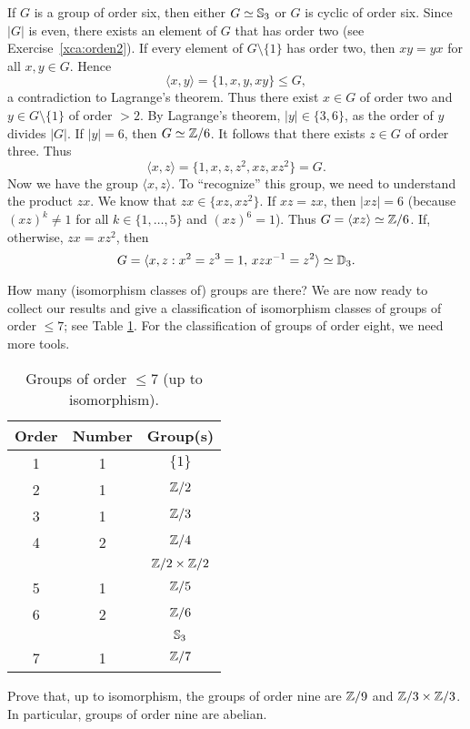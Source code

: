 \begin{example}
If $G$ is a group of order six, then
either $G\simeq\mathbb{S}_3$ or $G$ is cyclic of order six. 
Since $|G|$ is even, there exists an element of $G$ 
that has order two (see Exercise~\ref{xca:orden2}). 
If every element of $G\setminus\{1\}$ has order two, then
$xy=yx$ for all $x,y\in G$. Hence 
\[
\langle x,y\rangle=\{1,x,y,xy\}\leq G,
\]
a contradiction to Lagrange's theorem. Thus there exist 
$x\in G$ of order two 
and $y\in G\setminus\{1\}$ of order $>2$. 
By Lagrange's theorem, $|y|\in\{3,6\}$, 
as the order of $y$ divides $|G|$. If 
$|y|=6$, 
then $G\simeq\mathbb{Z}/6$. It follows that there exists 
$z\in G$ of order three. Thus 
\[
\langle x,z\rangle=\{1,x,z,z^2,xz,xz^2\}=G.
\]
Now we have the group $\langle x,z\rangle$. To ``recognize'' this group,
we need to understand the product $zx$. We know that
$zx\in\{xz,xz^2\}$. If $xz=zx$, then $|xz|=6$ (because
$(xz)^k\ne1$ for all $k\in\{1,\dots,5\}$ and
$(xz)^6=1$). Thus 
$G=\langle xz\rangle\simeq\mathbb{Z}/6$. If, otherwise, 
$zx=xz^2$, then 
\[
G=\langle x,z:x^2=z^3=1,\,xzx^{-1}=z^2\rangle\simeq\mathbb{D}_3.
\]
\end{example}

How many (isomorphism classes of) groups are there? We are now 
ready to collect our results and give a classification 
of isomorphism classes of groups of order $\leq7$; see
Table \ref{tab:grupos<8}. For the classification of groups
of order eight, we need more tools. 

\begin{table}[ht]
    \begin{tabular}{|c|c|c|}
    \hline
    Order & Number & Group(s)\\
    \hline
        1 & 1 & $\{1\}$ \\
        2 & 1 & $\mathbb{Z}/2$ \\
        3 & 1 & $\mathbb{Z}/3$ \\
        4 & 2 & $\mathbb{Z}/4$ \\
        && $\mathbb{Z}/2\times\mathbb{Z}/2$ \\
        5 & 1 & $\mathbb{Z}/5$ \\
        6 & 2 & $\mathbb{Z}/6$\\
        &&$\mathbb{S}_3$ \\
        7 & 1 & $\mathbb{Z}/7$ \\
    \hline
    \end{tabular}
    \caption{Groups of order $\leq7$ (up to isomorphism).}
    \label{tab:grupos<8}
\end{table}

\begin{exercise}
\label{xca:size9}
Prove that, up to isomorphism, the groups of order nine are 
$\mathbb{Z}/9$ and $\mathbb{Z}/3\times\mathbb{Z}/3$. In particular, groups of order
nine are abelian. 
\end{exercise}


